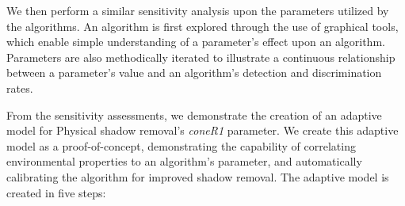 We then perform a similar sensitivity analysis upon the parameters utilized by the algorithms. An algorithm is first explored through the use of graphical tools, which enable simple understanding of a parameter's effect upon an algorithm. Parameters are also methodically iterated to illustrate a continuous relationship between a parameter's value and an algorithm's detection and discrimination rates.

From the sensitivity assessments, we demonstrate the creation of an adaptive model for Physical shadow removal's \textit{coneR1} parameter. We create this adaptive model as a proof-of-concept, demonstrating the capability of correlating environmental properties to an algorithm's parameter, and automatically calibrating the algorithm for improved shadow removal. The adaptive model is created in five steps:


